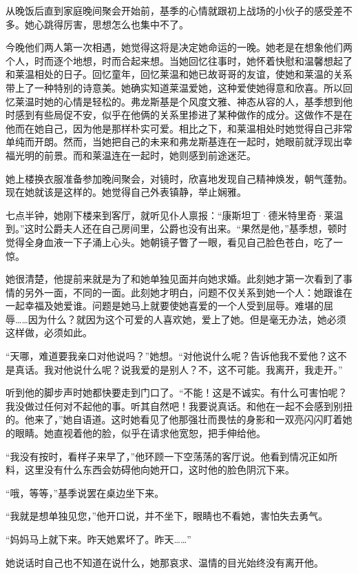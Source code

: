 \par 从晚饭后直到家庭晚间聚会开始前，基季的心情就跟初上战场的小伙子的感受差不多。她心跳得厉害，思想怎么也集中不了。
\par 今晚他们两人第一次相遇，她觉得这将是决定她命运的一晚。她老是在想象他们两个人，时而逐个地想，时而合起来想。当她回忆往事时，她怀着快慰和温馨想起了和莱温相处的日子。回忆童年，回忆莱温和她已故哥哥的友谊，使她和莱温的关系带上了一种特别的诗意美。她确实知道莱温爱她，这种爱使她得意和欣喜。所以回忆莱温时她的心情是轻松的。弗龙斯基是个风度文雅、神态从容的人，基季想到他时感到有些局促不安，似乎在他俩的关系里掺进了某种做作的成分。这做作不是在他而在她自己，因为他是那样朴实可爱。相比之下，和莱温相处时她觉得自己非常单纯而开朗。然而，当她把自己的未来和弗龙斯基连在一起时，她眼前就浮现出幸福光明的前景。而和莱温连在一起时，她则感到前途迷茫。
\par 她上楼换衣服准备参加晚间聚会，对镜时，欣喜地发现自己精神焕发，朝气蓬勃。现在她就该是这样的。她觉得自己外表镇静，举止娴雅。
\par 七点半钟，她刚下楼来到客厅，就听见仆人禀报：“康斯坦丁·德米特里奇·莱温到。”这时公爵夫人还在自己房间里，公爵也没有出来。“果然是他，”基季想，顿时觉得全身血液一下子涌上心头。她朝镜子瞥了一眼，看见自己脸色苍白，吃了一惊。
\par 她很清楚，他提前来就是为了和她单独见面并向她求婚。此刻她才第一次看到了事情的另外一面，不同的一面。此刻她才明白，问题不仅关系到她一个人：她跟谁在一起幸福及她爱谁。问题是她马上就要使她喜爱的一个人受到屈辱。难堪的屈辱……因为什么？就因为这个可爱的人喜欢她，爱上了她。但是毫无办法，她必须这样做，必须如此。
\par “天哪，难道要我亲口对他说吗？”她想。“对他说什么呢？告诉他我不爱他？这不是真话。我对他说什么呢？说我爱的是别人？不，这不可能。我离开，我走开。”
\par 听到他的脚步声时她都快要走到门口了。“不能！这是不诚实。有什么可害怕呢？我没做过任何对不起他的事。听其自然吧！我要说真话。和他在一起不会感到别扭的。他来了，”她自语道。这时她看见了他那强壮而畏怯的身影和一双亮闪闪盯着她的眼睛。她直视着他的脸，似乎在请求他宽恕，把手伸给他。
\par “我没有按时，看样子来早了，”他环顾一下空荡荡的客厅说。他看到情况正如所料，这里没有什么东西会妨碍他向她开口，这时他的脸色阴沉下来。
\par “哦，等等，”基季说罢在桌边坐下来。
\par “我就是想单独见您，”他开口说，并不坐下，眼睛也不看她，害怕失去勇气。
\par “妈妈马上就下来。昨天她累坏了。昨天……”
\par 她说话时自己也不知道在说什么，她那哀求、温情的目光始终没有离开他。
